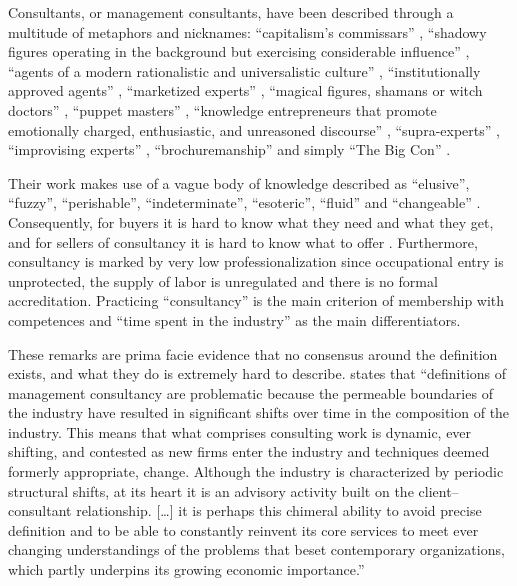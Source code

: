 \documentclass[12pt]{article}
\begin{document}
Consultants, or management consultants, have been described through a
multitude of metaphors and nicknames: ``capitalism's commissars''
\citep[ 93]{thrift2005}, ``shadowy figures operating in the background
but exercising considerable influence'' \citep[ 31]{kipping2012},
``agents of a modern rationalistic and universalistic culture'' \citep[
190]{kipping2012}, ``institutionally approved agents'' \citep[
193]{kipping2012}, ``marketized experts'' \citep[ 265]{furusten2012},
``magical figures, shamans or witch doctors'' \citep[ 68]{fincham2002},
``puppet masters'' \citep[ 69]{fincham2002}, ``knowledge entrepreneurs
that promote emotionally charged, enthusiastic, and unreasoned
discourse'' \citep[ 37]{leicht2006}, ``supra-experts'' \citep[
94]{kieser2006}, ``improvising experts'' \citep[ 272]{furusten2009},
``brochuremanship'' \citep[ 75]{levine1982} and simply ``The Big Con''
\citep{mazzucato2023}.

Their work makes use of a vague body of knowledge described as
``elusive'', ``fuzzy'', ``perishable'', ``indeterminate'', ``esoteric'',
``fluid'' and ``changeable'' \citep{muzio2011}. Consequently, for buyers
it is hard to know what they need and what they get, and for sellers of
consultancy it is hard to know what to offer \citep[ 266]{furusten2012}.
Furthermore, consultancy is marked by very low professionalization since
occupational entry is unprotected, the supply of labor is unregulated
and there is no formal accreditation. \citep[ 20]{fincham2006}
Practicing ``consultancy'' is the main criterion of membership with
competences and ``time spent in the industry'' as the main
differentiators.

These remarks are prima facie evidence that no consensus around the
definition exists, and what they do is extremely hard to describe.
\citet[24]{kipping2012} states that ``definitions of management
consultancy are problematic because the permeable boundaries of the
industry have resulted in significant shifts over time in the
composition of the industry. This means that what comprises consulting
work is dynamic, ever shifting, and contested as new firms enter the
industry and techniques deemed formerly appropriate, change. Although
the industry is characterized by periodic structural shifts, at its
heart it is an advisory activity built on the client--consultant
relationship. {[}\ldots{]} it is perhaps this chimeral ability to avoid
precise definition and to be able to constantly reinvent its core
services to meet ever changing understandings of the problems that beset
contemporary organizations, which partly underpins its growing economic
importance.''
\end{document}
